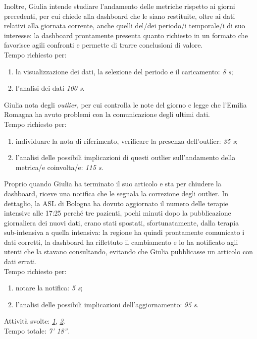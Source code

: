 Inoltre, Giulia intende studiare l'andamento delle metriche rispetto ai giorni precedenti, per cui chiede alla dashboard che le siano restituite, oltre ai dati relativi alla giornata corrente, anche quelli del/dei periodo/i temporale/i di suo interesse: la dashboard prontamente presenta quanto richiesto in un formato che favorisce agili confronti e permette di trarre conclusioni di valore.\\
Tempo richiesto per:
\begin{enumerate}
    \item la visualizzazione dei dati, la selezione del periodo e il caricamento: \textit{8 s};
    \item l'analisi dei dati \textit{100 s}.
\end{enumerate}

Giulia nota degli \textit{outlier}, per cui controlla le note del giorno e legge che l'Emilia Romagna ha avuto problemi con la comunicazione degli ultimi dati.\\
Tempo richiesto per:
\begin{enumerate}
    \item individuare la nota di riferimento, verificare la presenza dell'outlier: \textit{35 s};
    \item l'analisi delle possibili implicazioni di questi outlier sull'andamento della metrica/e coinvolta/e: \textit{115 s}.
\end{enumerate}

Proprio quando Giulia ha terminato il suo articolo e sta per chiudere la dashboard, riceve una notifica che le segnala la correzione degli outlier. In dettaglio, la ASL di Bologna ha dovuto aggiornato il numero delle terapie intensive alle 17:25 perché tre pazienti, pochi minuti dopo la pubblicazione giornaliera dei nuovi dati, erano stati spostati, sfortunatamente, dalla terapia sub-intensiva a quella intensiva: la regione ha quindi prontamente comunicato i dati corretti, la dashboard ha riflettuto il cambiamento e lo ha notificato agli utenti che la stavano consultando, evitando che Giulia pubblicasse un articolo con dati errati.\\
Tempo richiesto per:
\begin{enumerate}
    \item notare la notifica: \textit{5 s};
    \item l'analisi delle possibili implicazioni dell'aggiornamento: \textit{95 s}.
\end{enumerate}
\noindent
Attività svolte: \hyperref[itm:1]{\textit{1}}, \hyperref[itm:2]{\textit{2}}.\\  
Tempo totale: \textit{7' 18''}. 

